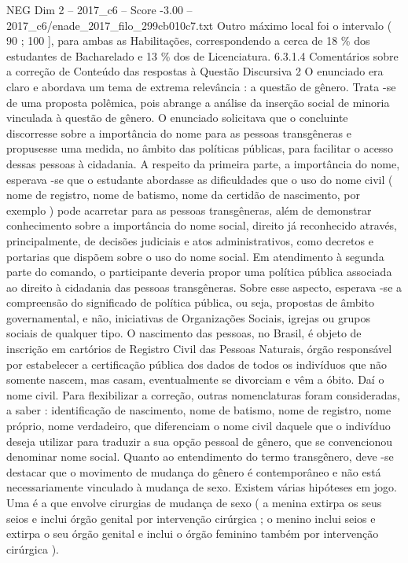\begin{textsample}{NEG Dim 2 – 2017\_c6 – Score -3.00 – 2017\_c6/enade\_2017\_filo\_299cb010c7.txt}
Outro máximo local foi o intervalo ( 90 ; 100 ], para ambas as Habilitações, correspondendo a cerca de 18 \% dos estudantes de Bacharelado e 13 \% dos de Licenciatura. 6.3.1.4 Comentários sobre a correção de Conteúdo das respostas à Questão Discursiva 2 O enunciado era claro e abordava um tema de extrema relevância : a questão de gênero.
Trata -se de uma proposta polêmica, pois abrange a análise da inserção social de minoria vinculada à questão de gênero.
O enunciado solicitava que o concluinte discorresse sobre a importância do nome para as pessoas transgêneras e propusesse uma medida, no âmbito das políticas públicas, para facilitar o acesso dessas pessoas à cidadania.
A respeito da primeira parte, a importância do nome, esperava -se que o estudante abordasse as dificuldades que o uso do nome civil ( nome de registro, nome de batismo, nome da certidão de nascimento, por exemplo ) pode acarretar para as pessoas transgêneras, além de demonstrar conhecimento sobre a importância do nome social, direito já reconhecido através, principalmente, de decisões judiciais e atos administrativos, como decretos e portarias que dispõem sobre o uso do nome social.
Em atendimento à segunda parte do comando, o participante deveria propor uma política pública associada ao direito à cidadania das pessoas transgêneras.
Sobre esse aspecto, esperava -se a compreensão do significado de política pública, ou seja, propostas de âmbito governamental, e não, iniciativas de Organizações Sociais, igrejas ou grupos sociais de qualquer tipo.
O nascimento das pessoas, no Brasil, é objeto de inscrição em cartórios de Registro Civil das Pessoas Naturais, órgão responsável por estabelecer a certificação pública dos dados de todos os indivíduos que não somente nascem, mas casam, eventualmente se divorciam e vêm a óbito.
Daí o nome civil.
Para flexibilizar a correção, outras nomenclaturas foram consideradas, a saber : identificação de nascimento, nome de batismo, nome de registro, nome próprio, nome verdadeiro, que diferenciam o nome civil daquele que o indivíduo deseja utilizar para traduzir a sua opção pessoal de gênero, que se convencionou denominar nome social.
Quanto ao entendimento do termo transgênero, deve -se destacar que o movimento de mudança do gênero é contemporâneo e não está necessariamente vinculado à mudança de sexo.
Existem várias hipóteses em jogo.
Uma é a que envolve cirurgias de mudança de sexo ( a menina extirpa os seus seios e inclui órgão genital por intervenção cirúrgica ; o menino inclui seios e extirpa o seu órgão genital e inclui o órgão feminino também por intervenção cirúrgica ).

\end{textsample}
